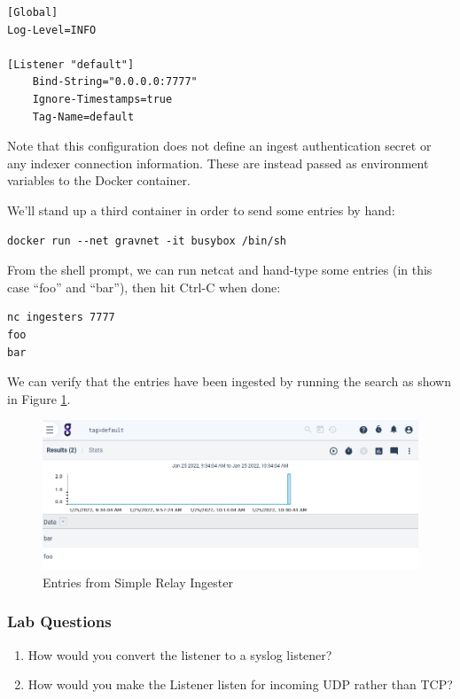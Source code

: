 \begin{Verbatim}[breaklines=true]
[Global]
Log-Level=INFO

[Listener "default"]
    Bind-String="0.0.0.0:7777"
    Ignore-Timestamps=true
    Tag-Name=default
\end{Verbatim}

Note that this configuration does not define an ingest authentication
secret or any indexer connection information. These are instead passed
as environment variables to the Docker container.

We'll stand up a third container in order to send some entries by
hand:

\begin{Verbatim}[breaklines=true]
docker run --net gravnet -it busybox /bin/sh
\end{Verbatim}

{From the shell prompt, we can run netcat and hand-type some entries (in
this case ``foo'' and ``bar''), then hit Ctrl-C when done:}

\begin{Verbatim}[breaklines=true]
nc ingesters 7777
foo
bar
\end{Verbatim}

We can verify that the entries have been ingested by running the search
 as shown in Figure \ref{fig:simple-relay-lab}.

\begin{figure}
	\includegraphics{images/igst-syslog-lab.png}
	\caption{Entries from Simple Relay Ingester}
	\label{fig:simple-relay-lab}
\end{figure}

\subsubsection{Lab Questions}

\begin{enumerate}
\item
  How would you convert the listener to a syslog listener?
\item
  How would you make the Listener listen for incoming UDP rather than
  TCP?
\end{enumerate}

